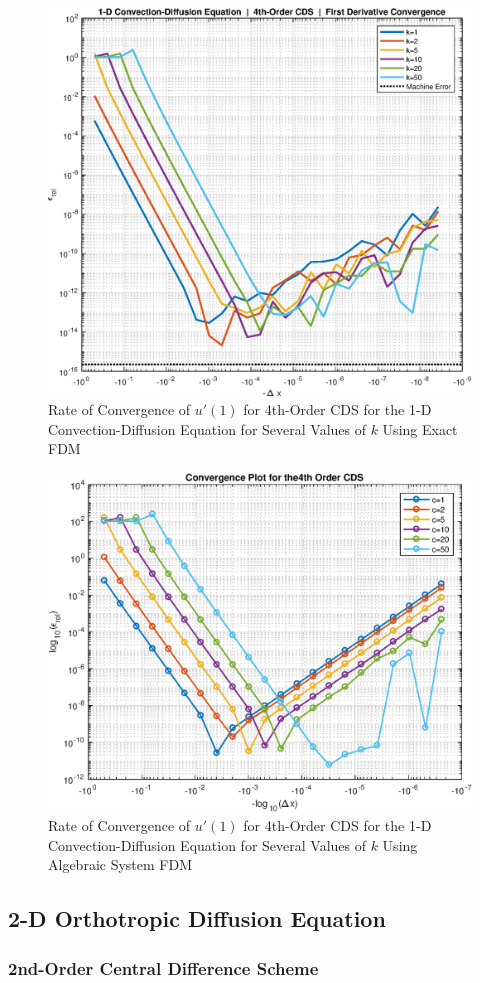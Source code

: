 \documentclass[10pt]{article}		%
\numberwithin{equation}{section}
\begin{document}
\begin{figure}[H]
	\begin{center}
		\includegraphics[width = 0.5\linewidth]{1dconv4oconv}
		\caption{Rate of Convergence of $u'(1)$ for 4th-Order CDS for the 1-D Convection-Diffusion Equation for Several Values of $k$ Using Exact FDM}	
	\end{center}
\end{figure}

\begin{figure}[H]
	\begin{center}
		\includegraphics[width = 0.5\linewidth]{convergence_4th_order_cds}
		\caption{Rate of Convergence of $u'(1)$ for 4th-Order CDS for the 1-D Convection-Diffusion Equation for Several Values of $k$ Using Algebraic System FDM}	
	\end{center}
\end{figure}

\subsection{2-D Orthotropic Diffusion Equation}

\subsubsection{2nd-Order Central Difference Scheme}
\end{document}
